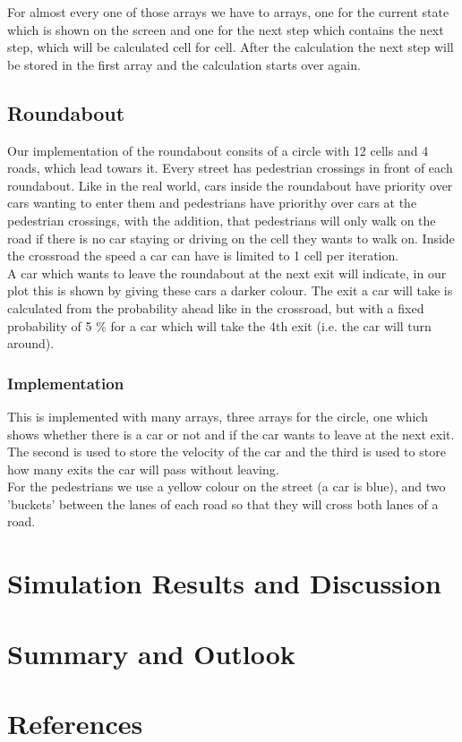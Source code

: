 \documentclass[11pt]{article}
\begin{document}
For almost every one of those arrays we have to arrays, one for the current state which is shown on the screen and one for the next step which contains the next step, which will be calculated cell for cell. 
After the calculation the next step will be stored in the first array and the calculation starts over again.

\subsection{Roundabout}
Our implementation of the roundabout consits of a circle with 12 cells and 4 roads, which lead towars it. Every street has pedestrian crossings in front of each roundabout. 
Like in the real world, cars inside the roundabout have priority over cars wanting to enter them and pedestrians have priorithy over cars at the pedestrian crossings, 
with the addition, that pedestrians will only walk on the road if there is no car staying or driving on the cell they wants to walk on. 
Inside the crossroad the speed a car can have is limited to 1 cell per iteration. \\

A car which wants to leave the roundabout at the next exit will indicate, in our plot this is shown by giving these cars a darker colour. 
The exit a car will take is calculated from the probability ahead like in the crossroad, but with a fixed probability of 5 \% for a car which will take the 4th exit (i.e. the car will turn around). \\
\subsubsection{Implementation}
This is implemented with many arrays, three arrays for the circle, one which shows whether there is a car or not and if the car wants to leave at the next exit. 
The second is used to store the velocity of the car and the third is used to store how many exits the car will pass without leaving.\\

For the pedestrians we use a yellow colour on the street (a car is blue), and two 'buckets' between the lanes of each road so that they will cross both lanes of a road.


\section{Simulation Results and Discussion}

\section{Summary and Outlook}

\section{References}
\end{document}
